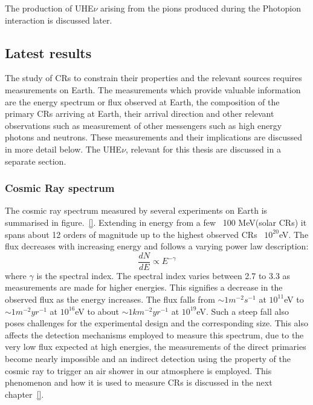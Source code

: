 The production of UHE$\nu$ arising from the pions produced during the Photopion interaction is discussed later. 

\subsection{Latest results}
\label{subsec:CRresults}
The study of CRs to constrain their properties and the relevant sources requires measurements on Earth. The measurements which provide valuable information are the energy spectrum or flux observed at Earth, the composition of the primary CRs arriving at Earth, their arrival direction and other relevant observations such as measurement of other messengers such as high energy photons and neutrons. These measurements and their implications are discussed in more detail below. The UHE$\nu$, relevant for this thesis are discussed in a separate section. 

\subsubsection*{Cosmic Ray spectrum}
\label{subsubsec:CRspectrum}
The cosmic ray spectrum measured by several experiments on Earth is summarised in figure.~\ref{}. Extending in energy from a few ~100 MeV(solar CRs) it spans about 12 orders of magnitude up to the highest observed CRs ~$10^{20}$eV. The flux decreases with increasing energy and follows a varying power law description:
\begin{equation}\label{eq:Powlaw}
  \frac{dN}{dE} \propto E^{-\gamma}   
\end{equation}
where $\gamma$ is the spectral index. The spectral index varies between 2.7 to 3.3 as measurements are made for higher energies. This signifies a decrease in the observed flux as the energy increases. The flux falls from $\sim 1m^{-2} s^{-1}$ at $10^{11}$eV to $\sim 1m^{-2} yr^{-1}$ at $10^{16}$eV to about $\sim 1km^{-2} yr^{-1}$ at $10^{19}$eV. Such a steep fall also poses challenges for the experimental design and the corresponding size. This also affects the detection mechanisms employed to measure this spectrum, due to the very low flux expected at high energies, the measurements of the direct primaries become nearly impossible and an indirect detection using the property of the cosmic ray to trigger an air shower in our atmosphere is employed. This phenomenon and how it is used to measure CRs is discussed in the next chapter~\ref{}.

